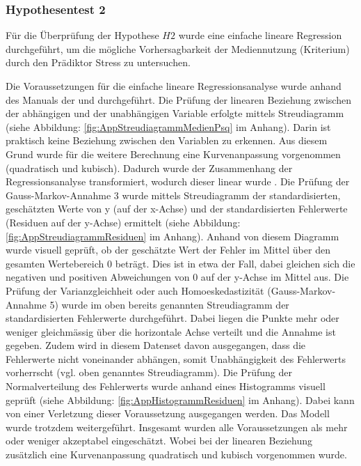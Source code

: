 \subsubsection{Hypothesentest 2}
Für die Überprüfung der Hypothese $H2$ wurde eine einfache lineare Regression durchgeführt, um die mögliche Vorhersagbarkeit der Mediennutzung (Kriterium) durch den Prädiktor Stress zu untersuchen.

Die Voraussetzungen für die einfache lineare Regressionsanalyse wurde anhand des Manuals der  und  durchgeführt. Die Prüfung der linearen Beziehung zwischen der abhängigen und der unabhängigen Variable erfolgte mittels Streudiagramm (siehe Abbildung: \ref{fig:AppStreudiagrammMedienPsq} im Anhang). Darin ist praktisch keine Beziehung zwischen den Variablen zu erkennen. Aus diesem Grund wurde für die weitere Berechnung eine Kurvenanpassung vorgenommen (quadratisch und kubisch). Dadurch wurde der Zusammenhang der Regressionsanalyse transformiert, wodurch dieser linear wurde \cite{UniversitatZurich2018}. Die Prüfung der Gauss-Markov-Annahme 3 \cite{UniversitatZurich2018} wurde mittels Streudiagramm der standardisierten, geschätzten Werte von y (auf der x-Achse) und der standardisierten Fehlerwerte (Residuen auf der y-Achse) ermittelt (siehe  Abbildung: \ref{fig:AppStreudiagrammResiduen} im Anhang). Anhand von diesem Diagramm wurde visuell geprüft, ob  der geschätzte Wert der Fehler im Mittel über den gesamten Wertebereich 0 beträgt. Dies ist in etwa der Fall, dabei gleichen sich die negativen und positiven Abweichungen von 0 auf der y-Achse im Mittel aus. Die Prüfung der Varianzgleichheit oder auch Homoeskedastizität (Gauss-Markov-Annahme 5) wurde im oben bereits genannten Streudiagramm der standardisierten Fehlerwerte durchgeführt. Dabei liegen die Punkte mehr oder weniger gleichmässig über die horizontale Achse verteilt und die Annahme ist gegeben. Zudem wird in diesem Datenset davon ausgegangen, dass die Fehlerwerte nicht voneinander abhängen, somit Unabhängigkeit des Fehlerwerts vorherrscht (vgl. oben genanntes Streudiagramm). Die Prüfung der Normalverteilung des Fehlerwerts wurde anhand eines Histogramms visuell geprüft (siehe Abbildung: \ref{fig:AppHistogrammResiduen} im Anhang). Dabei kann von einer Verletzung dieser Voraussetzung ausgegangen werden. Das Modell wurde trotzdem weitergeführt. Insgesamt wurden alle Voraussetzungen als mehr oder weniger akzeptabel eingeschätzt. Wobei bei der linearen Beziehung zusätzlich eine Kurvenanpassung quadratisch und kubisch vorgenommen wurde.

